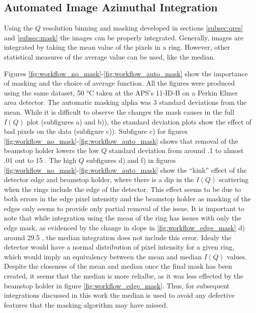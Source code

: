 \subsection{Automated Image Azimuthal Integration}
Using the $Q$ resolution binning and masking developed in sections \ref{subsec:qres} and \ref{subsec:mask} the images can be properly integrated.
Generally, images are integrated by taking the mean value of the pixels in a ring.
However, other statistical measures of the average value can be used, like the median.

Figures \ref{fig:workflow_no_mask}-\ref{fig:workflow_auto_mask} show the importance of masking and the choice of average function.
All the figures were produced using the same dataset, 50 \si{\degree}C  taken at the APS's 11-ID-B on a Perkin Elmer area detector.
The automatic masking alpha was $3$ standard deviations from the mean.
While it is difficult to observe the changes the mask causes in the full $I(Q)$ plot (subfigures a) and b)), the standard deviation plots show the effect of bad pixels on the data (subfigure c)).
Subfigure c) for figures \ref{fig:workflow_no_mask}-\ref{fig:workflow_auto_mask} shows that removal of the beamstop holder lowers the low $Q$ standard deviation from around .1 to almost .01 out to 15 \iA.
The high $Q$ subfigures d) and f) in figures \ref{fig:workflow_no_mask}-\ref{fig:workflow_auto_mask} show the ``kink'' effect of the detector edge and beamstop holder, where there is a dip in the $I(Q)$ scattering when the rings include the edge of the detector.
This effect seems to be due to both errors in the edge pixel intensity and the beamstop holder as masking of the edges only seems to provide only partial removal of the issue.
It is important to note that while integration using the mean of the ring has issues with only the edge mask, as evidenced by the change in slope in \ref{fig:workflow_edge_mask} d) around 29.5 \iA, the median integration does not include this error.
Idealy the detector would have a normal distribution of pixel intensity for a given ring, which would imply an equivalency between the mean and median $I(Q)$ values.
Despite the closeness of the mean and median once the final mask has been created, it seems that the median is more relialbe, as it was less effected by the beamstop holder in figure \ref{fig:workflow_edge_mask}.
Thus, for subsequent integrations discussed in this work the median is used to avoid any defective features that the masking algorithm may have missed.

